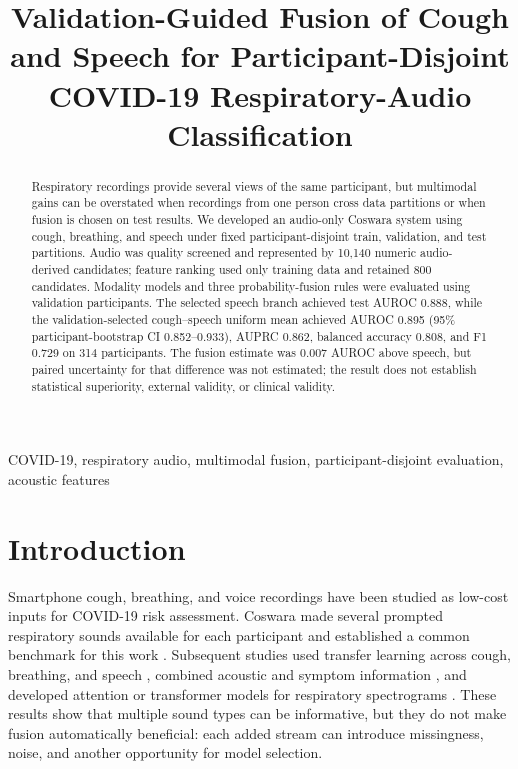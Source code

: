 \documentclass[conference]{IEEEtran}
\title{Validation-Guided Fusion of Cough and Speech for Participant-Disjoint COVID-19 Respiratory-Audio Classification}
\author{
\IEEEauthorblockN{Nishant Harkut and Ritu Tiwari}
\IEEEauthorblockA{Department of Information Technology\\
Atal Bihari Vajpayee Indian Institute of Information Technology and Management\\
Gwalior, India}
}
\begin{document}
\maketitle

\begin{abstract}
Respiratory recordings provide several views of the same participant, but
multimodal gains can be overstated when recordings from one person cross data
partitions or when fusion is chosen on test results. We developed an audio-only
Coswara system using cough, breathing, and speech under fixed
participant-disjoint train, validation, and test partitions. Audio was quality
screened and represented by 10,140 numeric audio-derived candidates; feature ranking used
only training data and retained 800 candidates. Modality models and three
probability-fusion rules were evaluated using validation participants. The
selected speech branch achieved test AUROC 0.888, while the validation-selected
cough--speech uniform mean achieved AUROC 0.895 (95\% participant-bootstrap
CI 0.852--0.933), AUPRC 0.862, balanced accuracy 0.808, and F1 0.729 on 314
participants. The fusion estimate was 0.007 AUROC above speech, but paired
uncertainty for that difference was not estimated; the result does not
establish statistical superiority, external validity, or clinical validity.
\end{abstract}

\begin{IEEEkeywords}
COVID-19, respiratory audio, multimodal fusion, participant-disjoint evaluation,
acoustic features
\end{IEEEkeywords}

\section{Introduction}

Smartphone cough, breathing, and voice recordings have been studied as
low-cost inputs for COVID-19 risk assessment. Coswara made several prompted
respiratory sounds available for each participant and established a common
benchmark for this work \cite{bhattacharya2023coswara}. Subsequent studies
used transfer learning across cough, breathing, and speech
\cite{pahar2022transfer}, combined acoustic and symptom information
\cite{chetupalli2023multimodal}, and developed attention or transformer models
for respiratory spectrograms \cite{truong2024fair,aytekin2024hst}. These
results show that multiple sound types can be informative, but they do not make
fusion automatically beneficial: each added stream can introduce missingness,
noise, and another opportunity for model selection.
\end{document}
